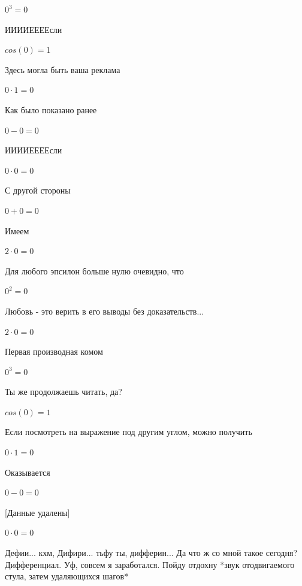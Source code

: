 \documentclass[12pt,a4paper,fleqn]{article}
\begin{document}
\begin{center}$0^{3} = 0$\end{center}
ИИИИЕЕЕЕсли\cite{link3}

\begin{center}$cos(0) = 1$\end{center}
Здесь могла быть ваша реклама

\begin{center}$0 \cdot 1 = 0$\end{center}
Как было показано ранее

\begin{center}$0-0 = 0$\end{center}
ИИИИЕЕЕЕсли\cite{link3}

\begin{center}$0 \cdot 0 = 0$\end{center}
С другой стороны

\begin{center}$0+0 = 0$\end{center}
Имеем

\begin{center}$2 \cdot 0 = 0$\end{center}
Для любого эпсилон больше нулю очевидно, что

\begin{center}$0^{2} = 0$\end{center}
Любовь - это верить в его выводы без доказательств...

\begin{center}$2 \cdot 0 = 0$\end{center}
Первая производная комом\cite{link2}

\begin{center}$0^{3} = 0$\end{center}
Ты же продолжаешь читать, да?

\begin{center}$cos(0) = 1$\end{center}
Если посмотреть на выражение под другим углом, можно получить

\begin{center}$0 \cdot 1 = 0$\end{center}
Оказывается

\begin{center}$0-0 = 0$\end{center}
[Данные удалены]

\begin{center}$0 \cdot 0 = 0$\end{center}
Дефии... кхм, Дифири... тьфу ты, дифферин... Да что ж со мной такое сегодня? Дифференциал. Уф, совсем я заработался. Пойду отдохну *звук отодвигаемого стула, затем удаляющихся шагов*
\end{document}
